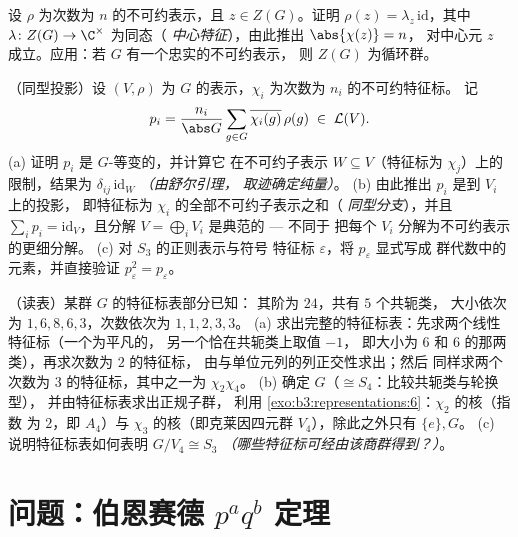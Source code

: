 \begin{exercise}[$\star\star$]\label{exo:b3:representations:10}
设 $\rho$ 为次数为 $n$ 的不可约表示，且 $z
\in Z(G)$。证明 $\rho(z) = \lambda_z\,\mathrm{id}$，其中
$\lambda \colon Z(G) \to \C^\times$ 为同态（
\emph{中心特征}），由此推出 $\abs{\chi(z)} = n$，
对中心元 $z$ 成立。应用：若 $G$ 有一个忠实的不可约表示，
则 $Z(G)$ 为循环群。
\end{exercise}

\begin{exercise}[$\star\star$]\label{exo:b3:representations:11}
（同型投影）设 $(V, \rho)$ 为
$G$ 的表示，$\chi_i$ 为次数为 $n_i$ 的不可约特征标。
记
\[
p_i = \frac{n_i}{\abs G}\sum_{g\in G}
\overline{\chi_i(g)}\,\rho(g) \;\in\; \mathcal L(V).
\]
(a) 证明 $p_i$ 是 $G$-等变的，并计算它
在不可约子表示 $W \subseteq
V$（特征标为 $\chi_j$）上的限制，结果为 $\delta_{ij}\,
\mathrm{id}_W$ \emph{（由舒尔引理，
取迹确定纯量）}。
(b) 由此推出 $p_i$ 是到 $V_i$ 上的投影，
即特征标为 $\chi_i$ 的全部不可约子表示之和（
\emph{同型分支}），并且 $\sum_ip_i =
\mathrm{id}_V$，且分解 $V =
\bigoplus_iV_i$ 是典范的 --- 不同于
把每个 $V_i$ 分解为不可约表示的更细分解。
(c) 对 $S_3$ 的正则表示与符号
特征标 $\varepsilon$，将 $p_\varepsilon$ 显式写成
群代数中的元素，并直接验证 $p_\varepsilon^2
= p_\varepsilon$。
\end{exercise}

\begin{exercise}[$\star\star$]\label{exo:b3:representations:12}
（读表）某群 $G$ 的特征标表部分已知：
其阶为 $24$，共有 $5$ 个共轭类，
大小依次为 $1, 6, 8, 6, 3$，次数依次为 $1, 1, 2, 3, 3$。
(a) 求出完整的特征标表：先求两个线性特征标（一个为平凡的，
另一个恰在共轭类上取值 $-1$，
即大小为 $6$ 和 $6$ 的那两类），再求次数为 $2$ 的特征标，
由与单位元列的列正交性求出；然后
同样求两个次数为 $3$ 的特征标，其中之一为 $\chi_2\chi_4$。
(b) 确定 $G$（$\cong S_4$：比较共轭类与轮换型），
并由特征标表求出正规子群，
利用 \cref{exo:b3:representations:6}：$\chi_2$ 的核（指数
为 $2$，即 $A_4$）与 $\chi_3$ 的核（即克莱因四元群 $V_4$），除此之外只有
$\{e\}, G$。
(c) 说明特征标表如何表明 $G/V_4 \cong S_3$
\emph{（哪些特征标可经由该商群得到？）}。
\end{exercise}

\section{问题：伯恩赛德 \texorpdfstring{$p^aq^b$}{paqb}
定理}

